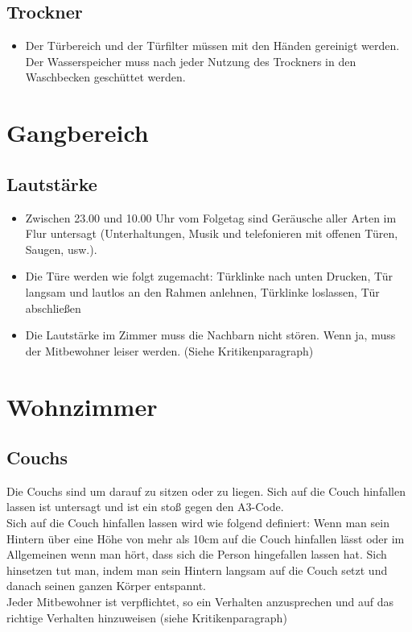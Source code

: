 \documentclass[10pt,a4paper,final]{article}
\begin{document}
\subsection{Trockner}

\begin{itemize}
\item Der Türbereich und  der Türfilter müssen mit den Händen gereinigt werden. Der Wasserspeicher muss nach jeder Nutzung des Trockners in den Waschbecken geschüttet werden.
\end{itemize}

\section{Gangbereich}
\subsection{Lautstärke}
 
\begin{itemize}
\item Zwischen 23.00 und 10.00 Uhr vom Folgetag sind Geräusche aller Arten im Flur untersagt (Unterhaltungen, Musik und telefonieren mit offenen Türen, Saugen, usw.).
\item Die Türe werden wie folgt zugemacht: Türklinke nach unten Drucken, Tür langsam und lautlos an den Rahmen anlehnen, Türklinke loslassen, Tür abschließen
\item Die Lautstärke im Zimmer muss die Nachbarn nicht stören. Wenn ja, muss der Mitbewohner leiser werden. (Siehe Kritikenparagraph) 
\end{itemize}

\section{Wohnzimmer}
\subsection{Couchs}
Die Couchs sind um darauf zu sitzen oder zu liegen. Sich auf die Couch hinfallen lassen ist untersagt und ist ein stoß gegen den A3-Code.\\ Sich auf die Couch hinfallen lassen wird wie folgend definiert: Wenn man sein Hintern über eine Höhe von mehr als 10cm auf die Couch hinfallen lässt oder im Allgemeinen wenn man hört, dass sich die Person hingefallen lassen hat. Sich hinsetzen tut man, indem man sein Hintern langsam auf die Couch setzt und danach seinen ganzen Körper entspannt.  \\Jeder Mitbewohner ist verpflichtet, so ein Verhalten anzusprechen und auf das richtige Verhalten hinzuweisen (siehe Kritikenparagraph)
\end{document}
